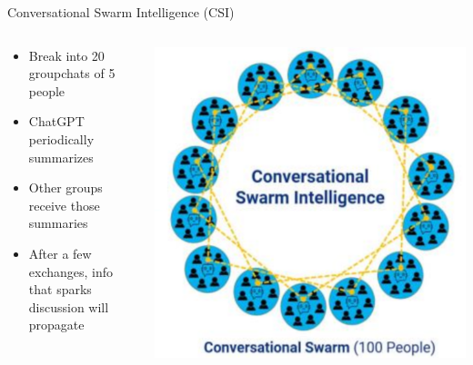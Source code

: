 \documentclass[aspectratio=169]{beamer}
\begin{document}
\begin{frame}{Conversational Swarm Intelligence (CSI)}
\begin{columns}[T]
    \begin{column}[T]{0.5\textwidth}
        \begin{itemize}
            \item Break into 20 groupchats of 5 people
            \item ChatGPT periodically summarizes
            \item Other groups receive those summaries
            \item After a few exchanges, info that sparks discussion will propagate
        \end{itemize}
    \end{column}
    \begin{column}{0.5\textwidth}
        \includegraphics[height=0.8\textheight]{imgs/CSI_section/conversational_swarm.png}
    \end{column}
\end{columns}
\end{frame}
\end{document}
